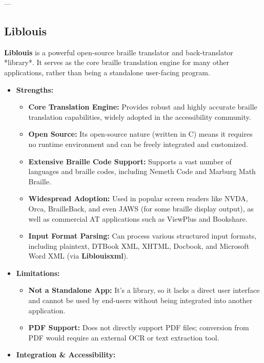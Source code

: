---

\subsection{Liblouis}
\textbf{Liblouis} is a powerful open-source braille translator and back-translator *library*. It serves as the core braille translation engine for many other applications, rather than being a standalone user-facing program.

\begin{itemize}
    \item \textbf{Strengths:}
    \begin{itemize}
        \item \textbf{Core Translation Engine:} Provides robust and highly accurate braille translation capabilities, widely adopted in the accessibility community.
        \item \textbf{Open Source:} Its open-source nature (written in C) means it requires no runtime environment and can be freely integrated and customized.
        \item \textbf{Extensive Braille Code Support:} Supports a vast number of languages and braille codes, including Nemeth Code and Marburg Math Braille.
        \item \textbf{Widespread Adoption:} Used in popular screen readers like NVDA, Orca, BrailleBack, and even JAWS (for some braille display output), as well as commercial AT applications such as ViewPlus and Bookshare.
        \item \textbf{Input Format Parsing:} Can process various structured input formats, including plaintext, DTBook XML, XHTML, Docbook, and Microsoft Word XML (via \textbf{Liblouisxml})\footnotemark{}.
    \end{itemize}
    \item \textbf{Limitations:}
    \begin{itemize}
        \item \textbf{Not a Standalone App:} It's a library, so it lacks a direct user interface and cannot be used by end-users without being integrated into another application.
        \item \textbf{PDF Support:} Does not directly support PDF files; conversion from PDF would require an external OCR or text extraction tool.
    \end{itemize}
    \item \textbf{Integration & Accessibility:}
    \begin{itemize}

\end{itemize}
\end{itemize}
